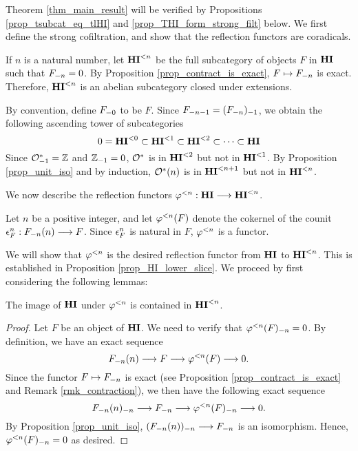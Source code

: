 Theorem \ref{thm_main_result} will be verified by Propositions
\ref{prop_tsubcat_eq_tlHI} and \ref{prop_THI_form_strong_filt} 
below. We first define the strong cofiltration, and show that the 
reflection functors are coradicals. 

\begin{defn}\label{def_TFHI}
If $n$ is a natural number, let $\TFHI{n}$ be the full 
subcategory of objects $F$ in $\HI$ such that $\RHI[n]{F} = 0$. 
By Proposition \ref{prop_contract_is_exact}, $F \mapsto 
\RHI[n]{F}$ is exact. Therefore, $\TFHI{n}$ is an abelian 
subcategory closed under extensions.
\end{defn}

By convention, define $\RHI[0]{F}$ to be $F$. Since 
$\RHI[n - 1]{F} = \RHI{(\RHI[n]{F})}$, we obtain the following 
ascending tower of subcategories
\[
0 = \TLHI{0}{\HI} \subset \TLHI{1}{\HI} \subset \TLHI{2}{\HI} 
   \subset \cdots \subset \HI
\]
Since $\RHI{\Ox} = \Z$ and $\RHI{\Z} = 0$, $\Ox$ is in 
$\TLHI{2}{\HI}$ but not in $\TLHI{1}{\HI}$. By Proposition 
\ref{prop_unit_iso} and by induction, $\LHI[n]{\Ox}$ is in 
$\TLHI{n + 1}{\HI}$ but not in $\TLHI{n}{\HI}$.

We now describe the reflection functors $\tlHI{n} : \HI \to 
\TLHI{n}{\HI}$. 

\begin{defn}
Let $n$ be a positive integer, and let $\tlHI{n}(F)$ denote the 
cokernel of the counit $\cuHI^n_F: \LHI[n]{\RHI[n]{F}} \to F$. 
Since $\cuHI^n_F$ is natural in $F$, $\tlHI{n}$ is a functor.
\end{defn}

We will show that $\tlHI{n}$ is the desired reflection functor
from $\HI$ to $\TFHI{n}$. This is established in Proposition
\ref{prop_HI_lower_slice}. We proceed by first considering the
following lemmas:

\begin{lem}\label{lem_tlHI_in_TLHI}
The image of $\HI$ under $\tlHI{n}$ is contained in 
$\TLHI{n}{\HI}$.
\end{lem}

\begin{proof}
Let $F$ be an object of $\HI$. We need to verify that 
$\RHI[n]{\tlHI{n}(F)} = 0$. By definition, we have an exact
sequence
\[
\LHI[n]{\RHI[n]{F}} \to F \to \tlHI{n}(F) \to 0.
\]
Since the functor $F \mapsto \RHI[n]{F}$ is exact (see Proposition
\ref{prop_contract_is_exact} and Remark \ref{rmk_contraction}), we 
then have the following exact sequence
\[
\RHI[n]{\LHI[n]{\RHI[n]{F}}} \to \RHI[n]{F} \to
\RHI[n]{\tlHI{n}(F)} \to 0.
\]
By Proposition \ref{prop_unit_iso}, $\RHI[n]{(\LHI[n]{\RHI[n]{F}})}
\to \RHI[n]{F}$ is an isomorphism. Hence,
$\RHI[n]{\tlHI{n}(F)} = 0$ as desired.
\end{proof}

